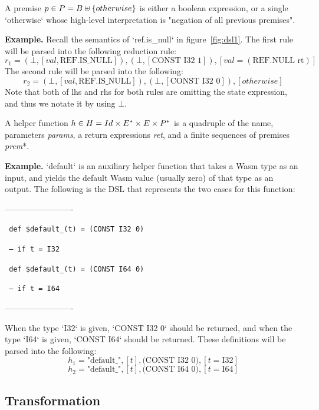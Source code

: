 A premise $p \in P = B \uplus \{otherwise\}$ is either a boolean expression, or a
single `otherwise` whose high-level interpretation is "negation of all previous premises".

\textbf{Example.} Recall the semantics of `ref.is\_null` in figure~\ref{fig:dsl1}.
The first rule will be parsed into the following reduction rule:
\[r_1=(\bot, [val, \text{REF.IS\_NULL}]), (\bot, [\text{CONST I32 1}]), [val = (\text{REF.NULL rt})]\]
The second rule will be parsed into the following:
\[r_2=(\bot, [val, \text{REF.IS\_NULL}]), (\bot, [\text{CONST I32 0}]), [otherwise]\]
Note that both of lhs and rhs for both rules are omitting the state expression,
and thus we notate it by using $\bot$.

A helper function $h \in H = Id \times E^\ast \times E \times P^\ast$ is a quadruple of
the name, parameters \textit{params}, a return expressions \textit{ret}, and a finite sequences of premises \textit{prem}*.

\textbf{Example.} `default` is an auxiliary helper function that takes a Wasm type as an input, and yields
the default Wasm value (usually zero) of that type as an output. The following is the
DSL that represents the two cases for this function:


-------------------------

\texttt{
def \$default\_(t) = (CONST I32 0)
}

\texttt{
-- if t = I32
}

\texttt{
def \$default\_(t) = (CONST I64 0)
}

\texttt{
-- if t = I64
}

-------------------------

When the type `I32` is given, `CONST I32 0` should be returned,
and when the type `I64` is given, `CONST I64` should be returned.
These definitions will be parsed into the following:
\[h_1=\text{"default\_"}, [t], \text{(CONST I32 0)}, [t = \text{I32}]\]
\[h_2=\text{"default\_"}, [t], \text{(CONST I64 0)}, [t = \text{I64}]\]


\subsection{Transformation}

